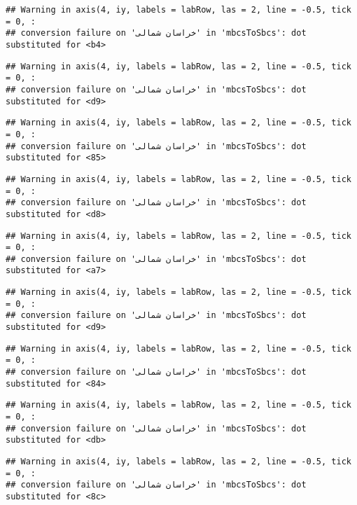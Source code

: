 \documentclass[
]{article}
\begin{document}
\begin{verbatim}
## Warning in axis(4, iy, labels = labRow, las = 2, line = -0.5, tick = 0, :
## conversion failure on 'خراسان شمالی' in 'mbcsToSbcs': dot substituted for <b4>
\end{verbatim}

\begin{verbatim}
## Warning in axis(4, iy, labels = labRow, las = 2, line = -0.5, tick = 0, :
## conversion failure on 'خراسان شمالی' in 'mbcsToSbcs': dot substituted for <d9>
\end{verbatim}

\begin{verbatim}
## Warning in axis(4, iy, labels = labRow, las = 2, line = -0.5, tick = 0, :
## conversion failure on 'خراسان شمالی' in 'mbcsToSbcs': dot substituted for <85>
\end{verbatim}

\begin{verbatim}
## Warning in axis(4, iy, labels = labRow, las = 2, line = -0.5, tick = 0, :
## conversion failure on 'خراسان شمالی' in 'mbcsToSbcs': dot substituted for <d8>
\end{verbatim}

\begin{verbatim}
## Warning in axis(4, iy, labels = labRow, las = 2, line = -0.5, tick = 0, :
## conversion failure on 'خراسان شمالی' in 'mbcsToSbcs': dot substituted for <a7>
\end{verbatim}

\begin{verbatim}
## Warning in axis(4, iy, labels = labRow, las = 2, line = -0.5, tick = 0, :
## conversion failure on 'خراسان شمالی' in 'mbcsToSbcs': dot substituted for <d9>
\end{verbatim}

\begin{verbatim}
## Warning in axis(4, iy, labels = labRow, las = 2, line = -0.5, tick = 0, :
## conversion failure on 'خراسان شمالی' in 'mbcsToSbcs': dot substituted for <84>
\end{verbatim}

\begin{verbatim}
## Warning in axis(4, iy, labels = labRow, las = 2, line = -0.5, tick = 0, :
## conversion failure on 'خراسان شمالی' in 'mbcsToSbcs': dot substituted for <db>
\end{verbatim}

\begin{verbatim}
## Warning in axis(4, iy, labels = labRow, las = 2, line = -0.5, tick = 0, :
## conversion failure on 'خراسان شمالی' in 'mbcsToSbcs': dot substituted for <8c>
\end{verbatim}
\end{document}
